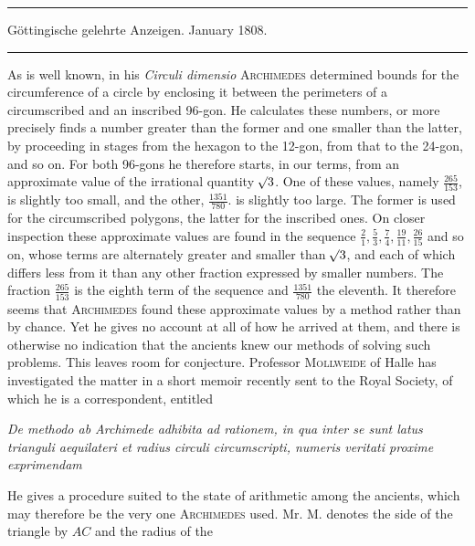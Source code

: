 \clearpage
{}%
\begin{center}
\rule{.85\textwidth}{.3pt}\par
Göttingische gelehrte Anzeigen. January 1808.\par
\rule{.85\textwidth}{.3pt}
\end{center}
\hspace*{\parindent}As is well known, in his \textit{Circuli dimensio} \textsc{Archimedes} determined bounds for the circumference of a circle by enclosing it between the perimeters of a circumscribed and an inscribed 96-gon. He calculates these numbers, or more precisely finds a number greater than the former and one smaller than the latter, by proceeding in stages from the hexagon to the 12-gon, from that to the 24-gon, and so on. For both 96-gons he therefore starts, in our terms, from an approximate value of the irrational quantity \(\mathord{{}^{}\!\surd}3\). One of these values, namely \(\frac{265}{153}\), is slightly too small, and the other, \(\frac{1351}{780}\). is slightly too large. The former is used for the circumscribed polygons, the latter for the inscribed ones. On closer inspection these approximate values are found in the sequence \(\frac21,\frac53,\frac74,\frac{19}{11},\frac{26}{15}\) and so on, whose terms are alternately greater and smaller than \(\mathord{{}^{}\!\surd}3\), and each of which differs less from it than any other fraction expressed by smaller numbers. The fraction \(\frac{265}{153}\) is the eighth term of the sequence and \(\frac{1351}{780}\) the eleventh. It therefore seems that \textsc{Archimedes} found these approximate values by a method rather than by chance. Yet he gives no account at all of how he arrived at them, and there is otherwise no indication that the ancients knew our methods of solving such problems. This leaves room for conjecture. Professor \textsc{Mollweide} of Halle has investigated the matter in a short memoir recently sent to the Royal Society, of which he is a correspondent, entitled
\begin{center}\textit{De methodo ab Archimede adhibita ad rationem, in qua inter se sunt latus trianguli aequilateri et radius circuli circumscripti, numeris veritati proxime exprimendam}\end{center}
\noindent He gives a procedure suited to the state of arithmetic among the ancients, which may therefore be the very one \textsc{Archimedes} used. Mr. M. denotes the side of the triangle by \(AC\) and the radius of the %
